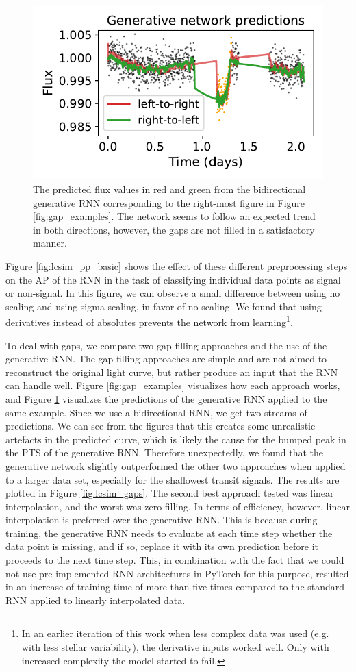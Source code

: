 \begin{figure}
    \centering
    \includegraphics[width=0.35\linewidth]{Experiments/Figures/Preprocessing/generative-rnn_predictions.pdf}
    \caption{The predicted flux values in red and green from the bidirectional generative RNN corresponding to the right-most figure in Figure \ref{fig:gap_examples}. The network seems to follow an expected trend in both directions, however, the gaps are not filled in a satisfactory manner.}
    \label{fig:generative_preds}
\end{figure}

Figure \ref{fig:lcsim_pp_basic} shows the effect of these different preprocessing steps on the AP of the RNN in the task of classifying individual data points as signal or non-signal. In this figure, we can observe a small difference between using no scaling and using sigma scaling, in favor of no scaling. We found that using derivatives instead of absolutes prevents the network from learning\footnote{In an earlier iteration of this work when less complex data was used (e.g. with less stellar variability), the derivative inputs worked well. Only with increased complexity the model started to fail.}.

To deal with gaps, we compare two gap-filling approaches and the use of the generative RNN. The gap-filling approaches are simple and are not aimed to reconstruct the original light curve, but rather produce an input that the RNN can handle well. Figure \ref{fig:gap_examples} visualizes how each approach works, and Figure \ref{fig:generative_preds} visualizes the predictions of the generative RNN applied to the same example. Since we use a bidirectional RNN, we get two streams of predictions. We can see from the figures that this creates some unrealistic artefacts in the predicted curve, which is likely the cause for the bumped peak in the PTS of the generative RNN. Therefore unexpectedly, we found that the generative network slightly outperformed the other two approaches when applied to a larger data set, especially for the shallowest transit signals. The results are plotted in Figure \ref{fig:lcsim_gaps}. The second best approach tested was linear interpolation, and the worst was zero-filling. In terms of efficiency, however, linear interpolation is preferred over the generative RNN. This is because during training, the generative RNN needs to evaluate at each time step whether the data point is missing, and if so, replace it with its own prediction before it proceeds to the next time step. This, in combination with the fact that we could not use pre-implemented RNN architectures in PyTorch for this purpose, resulted in an increase of training time of more than five times compared to the standard RNN applied to linearly interpolated data.

